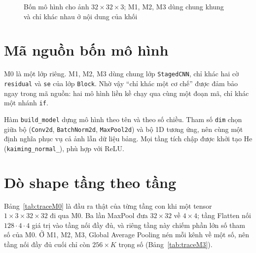 \begin{figure}[H]
  \centering
  \caption{Bốn mô hình cho ảnh $32\times32\times3$; M1, M2, M3 dùng chung khung và chỉ khác nhau ở nội dung của khối}
  \label{fig:kientruc}
\end{figure}

\section{Mã nguồn bốn mô hình}

M0 là một lớp riêng. M1, M2, M3 dùng chung lớp \texttt{StagedCNN}, chỉ khác hai cờ \texttt{residual} và \texttt{se}
của lớp \texttt{Block}. Nhờ vậy ``chỉ khác một cơ chế'' được đảm bảo ngay trong mã nguồn: hai mô hình liền kề chạy qua
cùng một đoạn mã, chỉ khác một nhánh \texttt{if}.


Hàm \texttt{build\_model} dựng mô hình theo tên và theo số chiều. Tham số \texttt{dim} chọn giữa bộ
(\texttt{Conv2d}, \texttt{BatchNorm2d}, \texttt{MaxPool2d}) và bộ 1D tương ứng, nên cùng một định nghĩa phục vụ cả ảnh
lẫn dữ liệu bảng. Mọi tầng tích chập được khởi tạo He (\texttt{kaiming\_normal\_}), phù hợp với ReLU.


\section{Dò shape tầng theo tầng}

Bảng~\ref{tab:traceM0} là đầu ra thật của từng tầng con khi một tensor $1\times3\times32\times32$ đi qua M0. Ba lần
MaxPool đưa $32\times32$ về $4\times4$; tầng Flatten nối $128\cdot4\cdot4$ giá trị vào tầng nối đầy đủ, và riêng tầng này
chiếm phần lớn số tham số của M0. Ở M1, M2, M3, Global Average Pooling nén mỗi kênh về một số, nên tầng nối đầy đủ cuối
chỉ còn $256\times K$ trọng số (Bảng~\ref{tab:traceM3}).

\begin{table}[H]
  \centering
  \begin{minipage}[t]{0.47\textwidth}
    \centering
    \caption{Dò shape của M0 (2D, $K=10$)}
    \label{tab:traceM0}
    \small
  \end{minipage}\hfill
  \begin{minipage}[t]{0.47\textwidth}
    \centering
    \caption{Dò shape của M3 (2D, $K=10$)}
    \label{tab:traceM3}
    \small
  \end{minipage}
\end{table}

